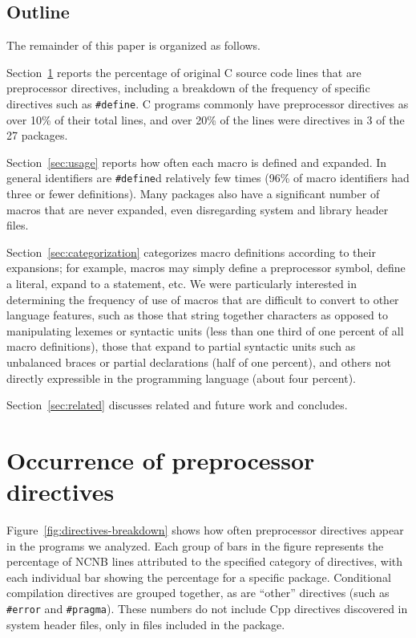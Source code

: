 \documentclass[11pt]{article}
\def\numpackages{27}
\begin{document}
\subsection{Outline}

The remainder of this paper is organized as follows.

Section~\ref{sec:directives} reports the percentage of original C source
code lines that are preprocessor directives, including a breakdown of the
frequency of specific directives such as {\tt \#define}.  C programs
commonly have preprocessor directives as over 10\% of their total lines,
and over 20\% of the lines were directives in 3 of the {\numpackages}
packages.

Section~\ref{sec:usage} reports how often each macro is defined and
expanded.  In general identifiers are {\tt \#define}d relatively few times
(96\% of macro identifiers had three or fewer definitions).  Many packages
also have a significant number of macros that are never expanded, even
disregarding system and library header files.

Section~\ref{sec:categorization} categorizes macro definitions according to
their expansions; for example, macros may simply define a preprocessor
symbol, define a literal, expand to a statement, etc.  We were particularly
interested in determining the frequency of use of macros that are difficult
to convert to other language features, such as those that string together
characters as opposed to manipulating lexemes or syntactic units (less than
one third of one percent of all macro definitions),
those that expand to partial syntactic units such as unbalanced
braces or partial declarations (half of one percent), and others not 
directly expressible in the programming language (about four percent).

Section~\ref{sec:related} discusses related and future work and concludes.


\section{Occurrence of preprocessor directives}
\label{sec:directives}

Figure~\ref{fig:directives-breakdown} shows how often preprocessor
directives appear in the programs we analyzed.  Each group of bars in the
figure represents the percentage of NCNB lines attributed to the specified
category of directives, with each individual bar showing the percentage for
a specific package.  Conditional compilation directives are grouped together, as
are ``other'' directives (such as {\tt \#error} and {\tt \#pragma}).  These
numbers do not include Cpp directives discovered in system header files,
only in files included in the package.
\end{document}
